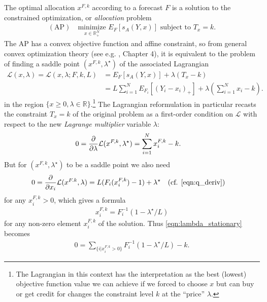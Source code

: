 \documentclass{article}
\begin{document}
The optimal allocation $x^{F,k}$ according to a forecast $F$ is a solution to the constrained optimization, or \emph{allocation} problem
\begin{align}
    (\mathrm{AP}) \quad \underset{x \in \mathbb{R}_{+}^N}{\mathrm{minimize}}\,\, E_{F}\left[s_A(Y,x)\right] \text{ subject to } 
    T_x = k. \label{AP}
\end{align}
The AP has a convex objective function and affine constraint, so from general convex optimization theory 
(see e.g. \cite{ruszczynski2011nonlinear}, Chapter 4), it is equivalent to the
problem of finding a saddle point $(x^{F,k}, \lambda^{\star})$ of the associated Lagrangian 
\begin{align}
\mathcal{L}(x, \lambda) = \mathcal{L}(x, \lambda; F, k, L) 
&= E_F\left[s_A(Y,x)\right] + \lambda(T_x - k) \\
&= L\sum_{i=1}^{N} E_{F_i}[(Y_i - x_i)_{+}] + \lambda\left(\sum_{i=1}^{N} x_i - k\right).  
\end{align}
in the region $\{x \geq 0, \lambda \in \mathbb{R}\}$.\footnote{The Lagrangian in this context has the interpretation as the best (lowest) objective function value we can achieve if we forced to choose $x$ but can buy or get credit for changes the constraint level $k$ 
at the ``price'' $\lambda$.}
The Lagrangian reformulation in particular recasts the constraint $T_x=k$ of the original problem as a first-order condition on $\mathcal{L}$ with respect to the new \emph{Lagrange multiplier} variable $\lambda$:
\begin{align}
0 = \frac{\partial {} }{\partial {\lambda}} \mathcal{L}(x^{F,k}, \lambda^{\star}) &= \sum_{i=1}^{N} x_i^{F,k} - k. \label{eqn:lambda_stationary}
\end{align}
But for $(x^{F,k}, \lambda^{\star})$ to be a saddle point we also need
\begin{align}
0 = \frac{\partial}{\partial x_i} \mathcal{L}(x^{F.k}, \lambda) &= L(F_i(x_i^{F,k})-1) + \lambda^{\star} 
\quad (\text{cf. \eqref{eqn:q_deriv}}) \label{eqn:x_stationary}
\end{align}
for any $x_i^{F,k} > 0$, which gives a formula 
\begin{align}
x_i^{F,k} = F_i^{-1}(1-\lambda^{\star}/L) \label{eqn:xfk_formula}
\end{align}
for any non-zero element $x_i^{F,k}$ of the solution. Thus \eqref{eqn:lambda_stationary} becomes
\begin{align}
0 = \sum_{\{i | x_i^{F,k} > 0\}} F_{i}^{-1}(1-\lambda^{\star}/L) - k. \label{eqn:lambda_stationary2}
\end{align}
\end{document}

